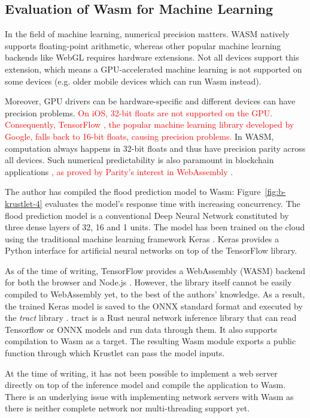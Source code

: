 \subsection{Evaluation of Wasm for Machine Learning}

In the field of machine learning, numerical precision matters. WASM natively supports floating-point arithmetic, whereas other popular machine learning backends like WebGL requires hardware extensions. Not all devices support this extension, which means a GPU-accelerated machine learning is not supported on some devices (e.g. older mobile devices which can run Wasm instead).

Moreover, GPU drivers can be hardware-specific and different devices can have precision problems. \textcolor{red}{On iOS, 32-bit floats are not supported on the GPU. Consequently, TensorFlow \cite{tensorflow}, the popular machine learning library developed by Google, falls back to 16-bit floats, causing precision problems.} In WASM, computation always happens in 32-bit floats and thus have precision parity across all devices. Such numerical predictability is also paramount in blockchain applications \textcolor{red}{, as proved by Parity's interest in WebAssembly} \cite{parity-wasm}.

The author has compiled the flood prediction model to Wasm: Figure~\ref{fig:b-krustlet-4} evaluates the model's response time with increasing concurrency. The flood prediction model is a conventional Deep Neural Network constituted by three dense layers of 32, 16 and 1 units. The model has been trained on the cloud using the traditional machine learning framework Keras \cite{keras}. Keras provides a Python interface for artificial neural networks on top of the TensorFlow library.

As of the time of writing, TensorFlow provides a WebAssembly (WASM) backend for both the browser and Node.js \cite{tf-wasm}. However, the library itself cannot be easily compiled to WebAssembly yet, to the best of the authors' knowledge. As a result, the trained Keras model is saved to the ONNX \cite{onnx} standard format and executed by the \emph{tract} library \cite{tract}. tract is a Rust neural network inference library that can read Tensorflow or ONNX models and run data through them. It also supports compilation to Wasm as a target. The resulting Wasm module exports a public function through which Krustlet can pass the model inputs. 

At the time of writing, it has not been possible to implement a web server directly on top of the inference model and compile the application to Wasm. There is an underlying issue with implementing network servers with Wasm as there is neither complete network nor multi-threading support yet.

